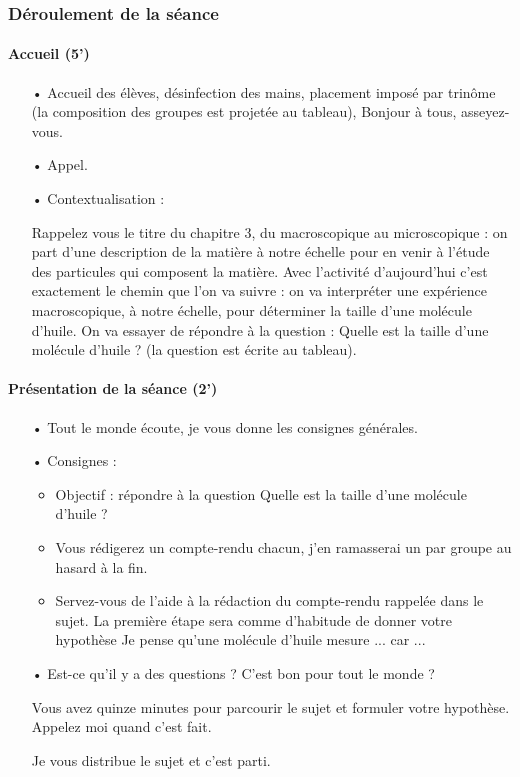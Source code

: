\documentclass[12pt,a4paper]{article}
\begin{document}
\subsubsection{Déroulement de la séance}

\paragraph{Accueil (5')}
\begin{itemize}
\item[•] Accueil des élèves, désinfection des mains, placement imposé par trinôme (la composition des groupes est projetée au tableau), \og Bonjour à tous, asseyez-vous. \fg{}
\item[•] Appel.
\item[•] Contextualisation : 

\og Rappelez vous le titre du chapitre 3, du macroscopique au microscopique : on part d'une description de la matière à notre échelle pour en venir à l'étude des particules qui composent la matière.
Avec l'activité d'aujourd'hui c'est exactement le chemin que l'on va suivre : on va interpréter une expérience macroscopique, à notre échelle, pour déterminer la taille d'une molécule d'huile.
On va essayer de répondre à la question : Quelle est la taille d'une molécule d'huile ?\fg{}
(la question est écrite au tableau).
\end{itemize}

\paragraph{Présentation de la séance (2')}
\begin{itemize}
\item[•]  \og Tout le monde écoute, je vous donne les consignes générales.\fg{}

\item[•] Consignes :
\begin{itemize}
\item Objectif : répondre à la question \og Quelle est la taille d'une molécule d'huile ? \fg{}
\item \og Vous rédigerez un compte-rendu chacun, j'en ramasserai un par groupe au hasard à la fin. \fg{}
\item \og Servez-vous de l'aide à la rédaction du compte-rendu rappelée dans le sujet.
La première étape sera comme d'habitude de donner votre hypothèse \og Je pense qu'une molécule d'huile mesure ... car ... \fg{}
\end{itemize}

\item[•] \og Est-ce qu'il y a des questions ?
C'est bon pour tout le monde ?

Vous avez quinze minutes pour parcourir le sujet et formuler votre hypothèse.
Appelez moi quand c'est fait.

Je vous distribue le sujet et c'est parti.
\fg{}
\end{itemize}
\end{document}
